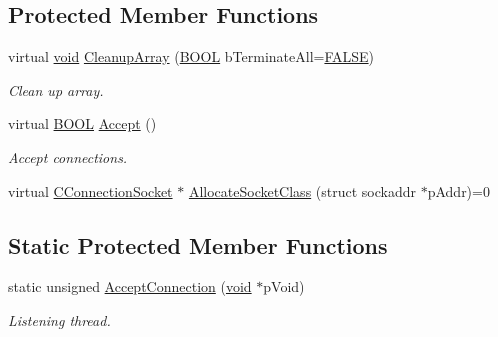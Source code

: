 \subsection*{\-Protected \-Member \-Functions}
\begin{DoxyCompactItemize}
\item 
virtual \hyperlink{_cpclient_8h_a6464f7480a0fd0ee170cba12b2c0497f}{void} \hyperlink{class_c_server_socket_aa6bbfa1461e437aa5ab864ee35016aa2}{\-Cleanup\-Array} (\hyperlink{_cpclient_8h_a3be13892ae7076009afcf121347dd319}{\-B\-O\-O\-L} b\-Terminate\-All=\hyperlink{_x_plat_8h_aa93f0eb578d23995850d61f7d61c55c1}{\-F\-A\-L\-S\-E})
\begin{DoxyCompactList}\small\item\em \-Clean up array. \end{DoxyCompactList}\item 
virtual \hyperlink{_cpclient_8h_a3be13892ae7076009afcf121347dd319}{\-B\-O\-O\-L} \hyperlink{class_c_server_socket_a3f1a261c6881f150caebd4389233382b}{\-Accept} ()
\begin{DoxyCompactList}\small\item\em \-Accept connections. \end{DoxyCompactList}\item 
virtual \hyperlink{class_c_connection_socket}{\-C\-Connection\-Socket} $\ast$ \hyperlink{class_c_server_socket_a5d9a8ba74dff11d71a2090c3fdf7c84a}{\-Allocate\-Socket\-Class} (struct sockaddr $\ast$p\-Addr)=0
\end{DoxyCompactItemize}
\subsection*{\-Static \-Protected \-Member \-Functions}
\begin{DoxyCompactItemize}
\item 
static unsigned \hyperlink{class_c_server_socket_a2290c6ce8fa0b268d9c89889a9e3eb89}{\-Accept\-Connection} (\hyperlink{_cpclient_8h_a6464f7480a0fd0ee170cba12b2c0497f}{void} $\ast$p\-Void)
\begin{DoxyCompactList}\small\item\em \-Listening thread. \end{DoxyCompactList}\end{DoxyCompactItemize}
